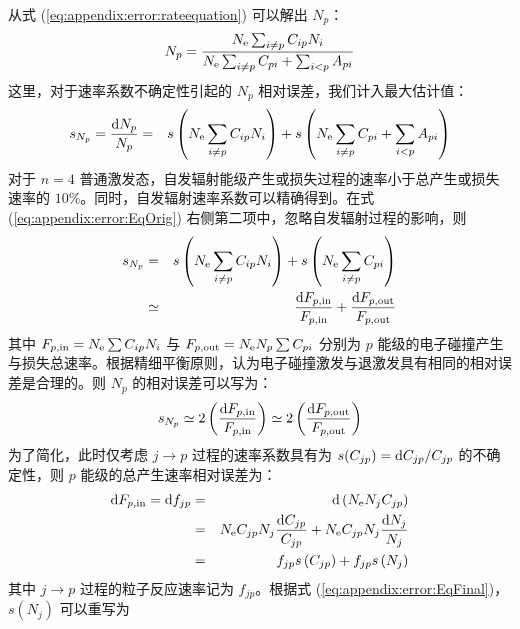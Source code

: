 从式 (\ref{eq:appendix:error:rateequation}) 可以解出 $N_p$：
\begin{equation}
N_p=\frac{N_{\rm e}\sum_{i\ne p}C_{ip}N_i}{N_{\rm e}\sum_{i\ne p}C_{pi}+\sum_{i<p}A_{pi}}
\label{eq:appendix:error:Np}
\end{equation}
这里，对于速率系数不确定性引起的 $N_p$ 相对误差，我们计入最大估计值\cite{YuChangxuan:book}：
\begin{eqnarray}
s_{N_p}=\frac{{\rm d}N_p}{N_p}& = &s\left(N_{\rm e}\sum_{i\ne p}C_{ip}N_i\right) + s\left(N_{\rm e}\sum_{i\ne p}C_{pi}+\sum_{i<p}A_{pi}\right)%
\label{eq:appendix:error:EqOrig}
\end{eqnarray}
对于 $n=4$ 普通激发态，自发辐射能级产生或损失过程的速率小于总产生或损失速率的 $10\%$。同时，自发辐射速率系数可以精确得到\cite{NISTdatabase}。在式 (\ref{eq:appendix:error:EqOrig}) 右侧第二项中，忽略自发辐射过程的影响，则
\begin{eqnarray}
s_{N_p}& = &s\left(N_{\rm e}\sum_{i\ne p}C_{ip}N_i\right) + s\left(N_{\rm e}\sum_{i\ne p}C_{pi}\right) \nonumber\\
            & \simeq & \frac{{\rm d}F_{p,{\rm in}}}{F_{p,{\rm in}}} + \frac{{\rm d}F_{p,{\rm out}}}{F_{p,{\rm out}}}
\label{eq:appendix:error:EqIgnoreAqi}
\end{eqnarray}
其中 $F_{p,{\rm in}}=N_{\rm e}\sum C_{ip}N_i$ 与 $F_{p,{\rm out}}=N_{\rm e}N_p\sum C_{pi}$ 分别为 $p$ 能级的电子碰撞产生与损失总速率。根据精细平衡\cite{Lieberman2005-book}原则，认为电子碰撞激发与退激发具有相同的相对误差是合理的。则 $N_p$ 的相对误差可以写为：
\begin{eqnarray}
s_{N_p} \simeq 2\left(\frac{{\rm d}F_{p,{\rm in}}}{F_{p,{\rm in}}}\right)
\simeq 2\left(\frac{{\rm d}F_{p,{\rm out}}}{F_{p,{\rm out}}}\right)
\label{eq:appendix:error:EqFinal}
\end{eqnarray}
为了简化，此时仅考虑 $j\to p$ 过程的速率系数具有为 $s(C_{jp})={\rm d}C_{jp}/C_{jp}$ 的不确定性\cite{Andrew2000PPCFSensitivity}，则 $p$ 能级的总产生速率相对误差为：
\begin{eqnarray}
{\rm d}F_{p,{\rm in}}={\rm d}f_{jp}&=&{\rm d}\left(N_{\rm e}N_jC_{jp}\right)\nonumber\\
&=&N_{\rm e}C_{jp}N_j\frac{{\rm d}C_{jp}}{C_{jp}}+N_{\rm e}C_{jp}N_j\frac{{\rm d}N_j}{N_j}\nonumber\\
&=&f_{jp}s\left(C_{jp}\right)+f_{jp}s\left(N_j\right)
\label{eq:appendix:error:dFin}
\end{eqnarray}
其中 $j\to p$ 过程的粒子反应速率记为 $f_{jp}$。根据式 (\ref{eq:appendix:error:EqFinal})，$s(N_j)$ 可以重写为
